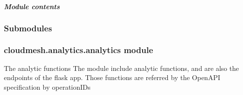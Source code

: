 \documentclass[letterpaper,10pt,english]{sphinxmanual}
\begin{document}
\subparagraph{Module contents}
\label{\detokenize{cloudmesh.analytics.server:module-cloudmesh.analytics.server}}\label{\detokenize{cloudmesh.analytics.server:module-contents}}

\subsubsection{Submodules}
\label{\detokenize{cloudmesh.analytics:submodules}}

\subsubsection{cloudmesh.analytics.analytics module}
\label{\detokenize{cloudmesh.analytics:module-cloudmesh.analytics.analytics}}\label{\detokenize{cloudmesh.analytics:cloudmesh-analytics-analytics-module}}
The analytic functions
The module include analytic functions, and are also the endpoints of the flask app. Those functions are referred by the
OpenAPI specification by operationIDs

\begin{fulllineitems}
\label{\detokenize{cloudmesh.analytics:cloudmesh.analytics.analytics.kmeans_fit}}
\end{fulllineitems}

\end{document}
